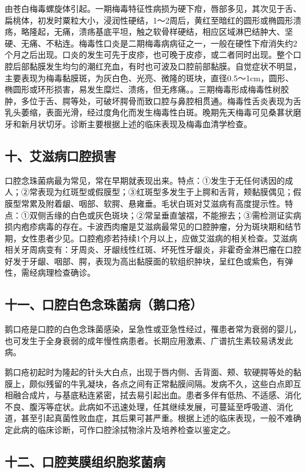 由苍白梅毒螺旋体引起。一期梅毒特征性病损为硬下疳，唇部多见，其次见于舌、扁桃体，初发时粟粒大小，浸润性硬结，1～2周后，黄红至暗红的圆形或椭圆形溃疡，略隆起，无痛，溃疡基底平坦，触之软骨样硬结，相应区域淋巴结肿大、坚硬、无痛、不粘连。梅毒性口炎是二期梅毒病病征之一，一般在硬性下疳消失约2个月之后出现。口炎的发生可先于皮疹，也可晚于皮疹，或二者同时出现。整个口腔后部黏膜发生均匀的潮红充血，有时也可波及口腔前部黏膜。自觉症状不明显，主要表现为梅毒黏膜斑，为灰白色、光亮、微隆的斑块，直径0.5～1cm，圆形、椭圆形或环形损害，易发生糜烂、溃疡，但无疼痛。。三期梅毒形成梅毒性树胶肿，多位于舌、腭等处，可破坏腭骨而致口腔与鼻腔相贯通。梅毒性舌炎表现为舌乳头萎缩，表面光滑，经过度角化而发生梅毒性白斑。晚期先天梅毒可见桑葚状磨牙和新月状切牙。诊断主要根据上述的临床表现及梅毒血清学检查。

\subsection{十、艾滋病口腔损害}

口腔念珠菌病最为常见，常在早期就表现出来。特点：①发生于无任何诱因的成人；②常表现为红斑型或假膜型；③红斑型多发生于上腭和舌背，颊黏膜偶见；假膜型常累及附着龈、咽部、软腭、悬雍垂。毛状白斑对艾滋病有高度提示性。特点：①双侧舌缘的白色或灰色斑块；②常呈垂直皱褶，不能擦去；③需检测证实病损内疱疹病毒的存在。卡波西肉瘤是艾滋病最常见的口腔肿瘤，分为斑块期和结节期，女性患者少见。口腔疱疹若持续1个月以上，应做艾滋病的相关检查。艾滋病相关牙周病变有：牙周炎、牙龈线性红斑、坏死性牙龈炎，非霍奇金淋巴瘤在口腔好发于牙龈、咽部、腭，表现为高出黏膜面的软组织肿块，呈红色或紫色，有弹性，需经病理检查确诊。

\subsection{十一、口腔白色念珠菌病（鹅口疮）}

鹅口疮是口腔的白色念珠菌感染，呈急性或亚急性经过，罹患者常为衰弱的婴儿，也可发生于全身衰弱的成年慢性病患者。长期应用激素、广谱抗生素较易诱发此病。

鹅口疮初起时为隆起的针头大白点，出现于唇内侧、舌背面、颊、软硬腭等处的黏膜上，颇似残留的牛乳凝块，各点之间有正常黏膜间隔。发病不久，这些白点即互相融合成片，与基底粘连紧密，拭去易引起出血。患者多伴有低热、不适感、消化不良、腹泻等症状。此病如不迅速处理，任其继续发展，可蔓延至呼吸道、消化道，甚至引起真菌性败血症，其后果可甚严重。根据上述的临床表现，一般不难确定此病的临床诊断，可作口腔涂拭物涂片及培养检查以鉴定之。

\subsection{十二、口腔荚膜组织胞浆菌病}

